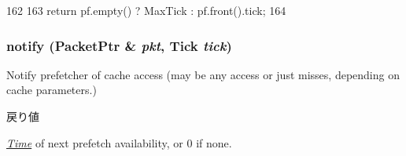 \begin{DoxyCode}
162     {
163         return pf.empty() ? MaxTick : pf.front().tick;
164     }
\end{DoxyCode}
\hypertarget{classBasePrefetcher_a1d4199bee2a7f9e8f22bf9e84d5ceda4}{
\subsubsection[{notify}]{ notify ({\bf PacketPtr} \& {\em pkt}, \/  {\bf Tick} {\em tick})}}
\label{classBasePrefetcher_a1d4199bee2a7f9e8f22bf9e84d5ceda4}
Notify prefetcher of cache access (may be any access or just misses, depending on cache parameters.) 
\begin{DoxyRetVals}{戻り値}
\item[{\em \hyperlink{classTime}{Time}}]of next prefetch availability, or 0 if none. \end{DoxyRetVals}



